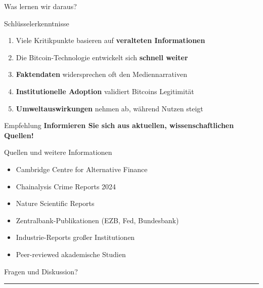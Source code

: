 \documentclass[aspectratio=169,t]{beamer}
\begin{document}
\begin{frame}{Was lernen wir daraus?}
    \begin{alertblock}{Schlüsselerkenntnisse}
        \begin{enumerate}
            \item Viele Kritikpunkte basieren auf \textbf{veralteten Informationen}
            \item Die Bitcoin-Technologie entwickelt sich \textbf{schnell weiter}
            \item \textbf{Faktendaten} widersprechen oft den Mediennarrativen
            \item \textbf{Institutionelle Adoption} validiert Bitcoins Legitimität
            \item \textbf{Umweltauswirkungen} nehmen ab, während Nutzen steigt
        \end{enumerate}
    \end{alertblock}
    
    \vspace{1em}
    \begin{block}{Empfehlung}
        \textcolor{bitcoinorange}{\textbf{Informieren Sie sich aus aktuellen, wissenschaftlichen Quellen!}}
    \end{block}
\end{frame}

\begin{frame}{Quellen und weitere Informationen}
    \footnotesize
    \begin{itemize}
        \item Cambridge Centre for Alternative Finance
        \item Chainalysis Crime Reports 2024
        \item Nature Scientific Reports
        \item Zentralbank-Publikationen (EZB, Fed, Bundesbank)
        \item Industrie-Reports großer Institutionen
        \item Peer-reviewed akademische Studien
    \end{itemize}
    
    \vspace{1em}
    \begin{center}
        \textcolor{bitcoinorange}{\Large Fragen und Diskussion?}
        \\[1em]
        \textcolor{bitcoinorange}{\rule{0.5\textwidth}{2pt}}
    \end{center}
\end{frame}
\end{document}
